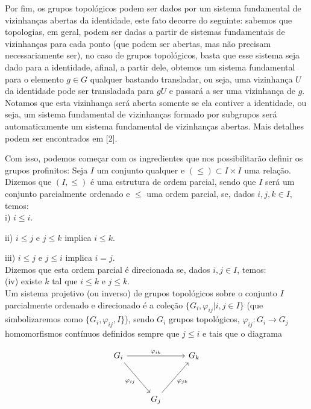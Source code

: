 \documentclass[12pt,a4paper]{article}
\theoremstyle{definition}
\begin{document}
Por fim, os grupos topológicos podem ser dados por um sistema fundamental de vizinhanças abertas da identidade, este fato decorre do seguinte: sabemos que topologias, em geral, podem ser dadas a partir de sistemas fundamentais de vizinhanças para cada ponto (que podem ser abertas, mas não precisam necessariamente ser), no caso de grupos topológicos, basta que esse sistema seja dado para a identidade, afinal, a partir dele, obtemos um sistema fundamental para o elemento $g\in G$ qualquer bastando transladar, ou seja, uma vizinhança $U$ da identidade pode ser transladada para $gU$ e passará a ser uma vizinhança de $g$. Notamos que esta vizinhança será aberta somente se ela contiver a identidade, ou seja, um sistema fundamental de vizinhanças formado por subgrupos será automaticamente um sistema fundamental de vizinhanças abertas. Mais detalhes podem ser encontrados em [2]. 

Com isso, podemos começar com os ingredientes que nos possibilitarão definir os grupos profinitos: Seja $I$ um conjunto qualquer e $(\leq)\subset I\times I$ uma relação. Dizemos que $(I, \leq)$ é uma estrutura de ordem parcial, sendo que $I$ será um conjunto parcialmente ordenado e $\leq$ uma ordem parcial, se, dados $i,j,k \in I$, temos: \\
    
i) $i\leq i$.
    
ii) $i\leq j$ e $j\leq k$ implica $i\leq k$.
    
iii) $i\leq j$ e $j\leq i$ implica $i=j$. \\
    
Dizemos que esta ordem parcial é direcionada se, dados $i,j\in I$, temos: \\
    
(iv) existe $k$ tal que $i\leq k$ e $j\leq k$. \\

Um sistema projetivo (ou inverso) de grupos topológicos sobre o conjunto $I$ parcialmente ordenado e direcionado é a coleção $\{G_i, \varphi_{ij}|i,j\in I\}$ (que simbolizaremos como $\{G_i, \varphi_{ij} , I\}$), sendo $G_i$ grupos topológicos, $\varphi_{ij}: G_i\rightarrow G_j$ homomorfismos contínuos definidos sempre que $j\leq i$ e tais que o diagrama
    
$$\begin{tikzcd}
    G_i  \arrow{rr}{\varphi_{ik}} \arrow{rdd}[swap]{\varphi_{ij}} & & G_k \\
    & & \\
    & G_j \arrow{uur}[swap]{\varphi_{jk}} &
\end{tikzcd}$$
    
\end{document}
